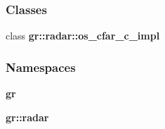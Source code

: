 \subsubsection*{Classes}
\begin{DoxyCompactItemize}
\item 
class {\bf gr\+::radar\+::os\+\_\+cfar\+\_\+c\+\_\+impl}
\end{DoxyCompactItemize}
\subsubsection*{Namespaces}
\begin{DoxyCompactItemize}
\item 
 {\bf gr}
\item 
 {\bf gr\+::radar}
\end{DoxyCompactItemize}
